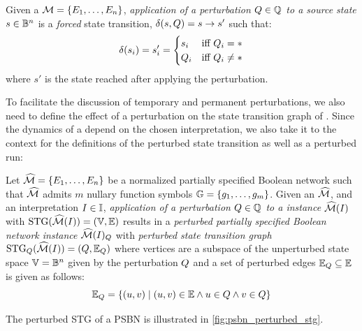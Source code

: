\begin{definition}
    \label{def:psbn_perturbation_application}
    Given a \PBN{} $\mathcal{M} = \{E_1, \ldots, E_n\}$, \emph{application of a perturbation $Q \in \mathbb{Q}$ to a source state $s \in \mathbb{B}^n$} is a \emph{forced} state transition, $\delta(s, Q) = s \to s'$ such that: 
    $$\delta(s_i) = s'_i = \begin{cases}
        s_i & \text{iff } Q_i = {*} \\
        Q_i & \text{iff } Q_i \neq {*}
    \end{cases}$$
    where $s'$ is the state reached after applying the perturbation.
\end{definition}

To facilitate the discussion of temporary and permanent perturbations, we also need to define the effect of a perturbation on the state transition graph of \PBN{}. Since the dynamics of a \PBN{} depend on the chosen interpretation, we also take it to the context for the definitions of the perturbed \PBN{} state transition as well as a perturbed \PBN{} run:

\begin{definition}
    \label{def:psbn_perturbed_stg}
    Let $\widehat{\mathcal{M}} = \{ E_1, \ldots, E_n \}$ be a normalized partially specified Boolean network such that $\widehat{\mathcal{M}}$ admits $m$ nullary function symbols $\mathbb{G} = \{g_1, \ldots, g_m \}$. Given an $\widehat{\mathcal{M}}$, and an interpretation $I \in \mathbb{I}$, \emph{application of a perturbation $Q \in \mathbb{Q}$ to a \PBN{} instance $\widehat{\mathcal{M}}(I)$} with $\text{\upshape STG}(\widehat{\mathcal{M}}(I)) = (\mathbb{V}, \mathbb{E})$ results in a \emph{perturbed partially specified Boolean network instance} $\widehat{\mathcal{M}}(I)_{Q}$ with \emph{perturbed state transition graph} $\text{\upshape STG}_{Q}(\widehat{\mathcal{M}}(I)) = (Q, \mathbb{E}_{Q})$ where vertices are a subspace of the unperturbed state space $\mathbb{V} = \mathbb{B}^n$ given by the perturbation $Q$ and a set of perturbed edges $\mathbb{E}_{Q} \subseteq \mathbb{E}$ is given as follows:
    $$
    \mathbb{E}_{Q} = \{(u, v) \mid (u, v) \in \mathbb{E} \land u \in Q \land v \in Q\}
    $$
\end{definition}

The perturbed STG of a PSBN is illustrated in \autoref{fig:psbn_perturbed_stg}.

